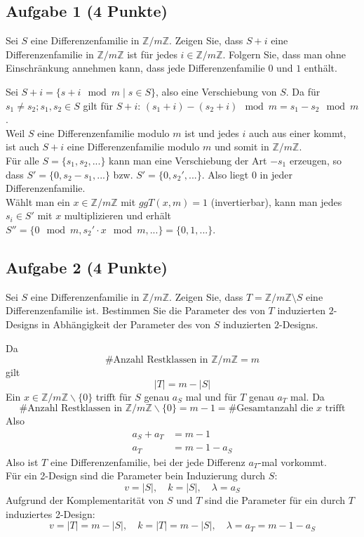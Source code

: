 \documentclass{article} %
\begin{document}
\subsection*{Aufgabe 1 (4 Punkte)}
Sei $S$ eine Differenzenfamilie in $\mathbb{Z}/m\mathbb{Z}$. Zeigen Sie, dass $S + i$ eine Differenzenfamilie in $\mathbb{Z}/m\mathbb{Z}$ ist für jedes $i \in \mathbb{Z}/m\mathbb{Z}$. Folgern Sie, dass man ohne Einschränkung annehmen kann, dass jede Differenzenfamilie $0$ und $1$ enthält.
\begin{mybox}
Sei $S + i = \{s+i \mod m \mid s \in S\}$, also eine Verschiebung von $S$. Da für $s_1 \neq s_2; s_1, s_2 \in S$ gilt für $S+i$: $(s_1 + i) - (s_2 + i) \mod m = s_1 - s_2 \mod m$. \\
Weil $S$ eine Differenzenfamilie modulo $m$ ist und jedes $i$ auch aus einer kommt, ist auch $S + i$ eine Differenzenfamilie modulo $m$ und somit in $\mathbb{Z}/m\mathbb{Z}$. \\ \newline 
Für alle $S =\{ s_1, s_2, ...\}$ kann man eine Verschiebung der Art $-s_1$ erzeugen, so dass $S' = \{0, s_2 - s_1, ...\}$ bzw. $S' = \{0, s_2', ...\}$. Also liegt 0 in jeder Differenzenfamilie. \\
Wählt man ein $x \in \mathbb{Z}/m\mathbb{Z}$ mit $ggT(x,m) = 1$ (invertierbar), kann man jedes $s_i \in S'$ mit $x$ multiplizieren und erhält $S'' = \{0 \mod m, s_2'\cdot x \mod m, ... \} = \{0, 1, ...\}$.  
\end{mybox}

\subsection*{Aufgabe 2 (4 Punkte)}
Sei $S$ eine Differenzenfamilie in $\mathbb{Z}/m\mathbb{Z}$. Zeigen Sie, dass $T = \mathbb{Z}/m\mathbb{Z} \setminus S$ eine Differenzenfamilie ist. Bestimmen Sie die Parameter des von $T$ induzierten $2$-Designs in Abhängigkeit der Parameter des von $S$ induzierten $2$-Designs.
\begin{mybox}
Da
\[\# \text{Anzahl Restklassen in } \mathbb{Z}/m\mathbb{Z} = m \]
gilt
\[|T| = m - |S|\]
Ein $x \in \mathbb{Z}/m\mathbb{Z} \backslash \{0\}$ trifft für $S$ genau $a_S$ mal und für $T$ genau $a_T$ mal. 
Da 
\[\# \text{Anzahl Restklassen in } \mathbb{Z}/m\mathbb{Z} \backslash \{0\} = m -1 = \# \text{Gesamtanzahl die $x$ trifft}\]
Also 
\begin{align*}
    a_S + a_T & = m -1 \\
     a_T & = m -1 - a_S 
\end{align*}
Also ist $T$ eine Differenzenfamilie, bei der jede Differenz $a_T$-mal vorkommt. 
\\
Für ein 2-Design sind die Parameter bein Induzierung durch $S$: 
\[v = |S|, \quad k = |S|, \quad \lambda = a_S\]
Aufgrund der Komplementarität von $S$ und $T$  sind die Parameter für ein durch $T$ induziertes 2-Design: 
\[v = |T| = m - |S|, \quad k = |T| = m - |S|, \quad \lambda = a_T =  m-1-a_S\]
\end{mybox}
\end{document}
